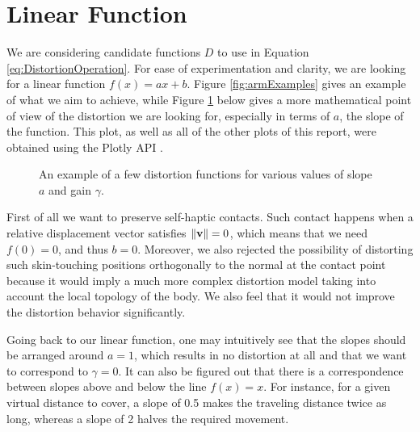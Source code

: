 \section{Linear Function}
\label{sec:linearFunction}
We are considering candidate functions $D$ to use in Equation \ref{eq:DistortionOperation}. For ease of experimentation and clarity, we are looking for a linear function $f(x) = ax + b$. Figure \ref{fig:armExamples} gives an example of what we aim to achieve, while Figure \ref{fig:plotsOfGamma} below gives a more mathematical point of view of the distortion we are looking for, especially in terms of $a$, the slope of the function. This plot, as well as all of the other plots of this report, were obtained using the Plotly API \cite{plotly}.

\begin{figure}[h]
    \caption{An example of a few distortion functions for various values of slope $a$ and gain $\gamma $.}\label{fig:plotsOfGamma}
\end{figure}

First of all we want to preserve self-haptic contacts. Such contact happens when a relative displacement vector satisfies $\lVert\mathbf{v}\rVert = 0$, which means that we need $f(0) = 0$, and thus $b = 0$. Moreover, we also rejected the possibility of distorting such skin-touching positions orthogonally to the normal at the contact point because it would imply a much more complex distortion model taking into account the local topology of the body. We also feel that it would not improve the distortion behavior significantly.

Going back to our linear function, one may intuitively see that the slopes should be arranged around $a=1$, which results in no distortion at all and that we want to correspond to $\gamma = 0$. It can also be figured out that there is a correspondence between slopes above and below the line $f(x) = x$. For instance, for a given virtual distance to cover, a slope of \num{0.5} makes the traveling distance twice as long, whereas a slope of \num{2} halves the required movement.

